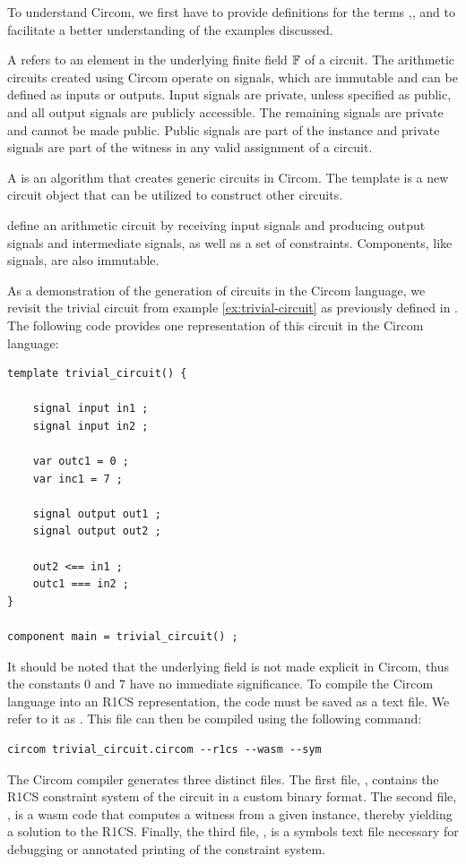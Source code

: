To understand Circom, we first have to provide definitions for the terms ,, and  to facilitate a better understanding of the examples discussed.

A  refers to an element in the underlying finite field $\mathbb{F}$ of a circuit. The arithmetic circuits created using Circom operate on signals, which are immutable and can be defined as inputs or outputs. Input signals are private, unless specified as public, and all output signals are publicly accessible. The remaining signals are private and cannot be made public. Public signals are part of the instance and private signals are part of the witness in any valid assignment of a circuit.

A  is an algorithm that creates generic circuits in Circom. The template is a new circuit object that can be utilized to construct other circuits.

 define an arithmetic circuit by receiving input signals and producing output signals and intermediate signals, as well as a set of constraints. Components, like signals, are also immutable.

\begin{example}
\label{ex:trivial-circuit-circom}
As a demonstration of the generation of circuits in the Circom language, we revisit the trivial circuit from example \ref{ex:trivial-circuit} as previously defined in . The following code provides one representation of this circuit in the Circom language:

\begin{lstlisting}
template trivial_circuit() {

    signal input in1 ;
    signal input in2 ;

    var outc1 = 0 ;
    var inc1 = 7 ;
    
    signal output out1 ;
    signal output out2 ;

    out2 <== in1 ;
    outc1 === in2 ;
}

component main = trivial_circuit() ;
\end{lstlisting}

It should be noted that the underlying field is not made explicit in Circom, thus the constants $0$ and $7$ have no immediate significance. To compile the Circom language into an R1CS representation, the code must be saved as a text file. We refer to it as . This file can then be compiled using the following command:
\begin{lstlisting}
circom trivial_circuit.circom --r1cs --wasm --sym
\end{lstlisting}

The Circom compiler generates three distinct files. The first file, , contains the R1CS constraint system of the circuit in a custom binary format. The second file, , is a wasm code that computes a witness from a given instance, thereby yielding a solution to the R1CS. Finally, the third file, , is a symbols text file necessary for debugging or annotated printing of the constraint system.
\end{example}

